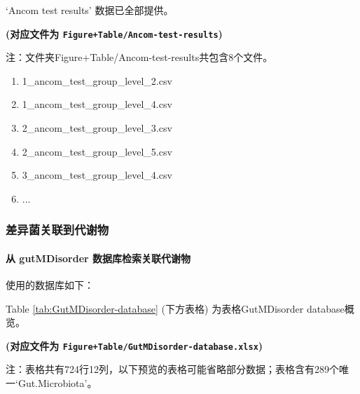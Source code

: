 \documentclass[
]{article}
\providecommand{\tightlist}{%
  \setlength{\itemsep}{0pt}\setlength{\parskip}{0pt}}
\begin{document}
`Ancom test results' 数据已全部提供。

\textbf{(对应文件为 \texttt{Figure+Table/Ancom-test-results})}

\begin{center}\begin{tcolorbox}[colback=gray!10, colframe=gray!50, width=0.9\linewidth, arc=1mm, boxrule=0.5pt]注：文件夹Figure+Table/Ancom-test-results共包含8个文件。

\begin{enumerate}\tightlist
\item 1\_ancom\_test\_group\_level\_2.csv
\item 1\_ancom\_test\_group\_level\_4.csv
\item 2\_ancom\_test\_group\_level\_3.csv
\item 2\_ancom\_test\_group\_level\_5.csv
\item 3\_ancom\_test\_group\_level\_4.csv
\item ...
\end{enumerate}\end{tcolorbox}
\end{center}

\hypertarget{ux5deeux5f02ux83ccux5173ux8054ux5230ux4ee3ux8c22ux7269}{%
\subsubsection{差异菌关联到代谢物}\label{ux5deeux5f02ux83ccux5173ux8054ux5230ux4ee3ux8c22ux7269}}

\hypertarget{ux4ece-gutmdisorder-ux6570ux636eux5e93ux68c0ux7d22ux5173ux8054ux4ee3ux8c22ux7269}{%
\paragraph{从 gutMDisorder 数据库检索关联代谢物}\label{ux4ece-gutmdisorder-ux6570ux636eux5e93ux68c0ux7d22ux5173ux8054ux4ee3ux8c22ux7269}}

使用的数据库如下：

Table \ref{tab:GutMDisorder-database} (下方表格) 为表格GutMDisorder database概览。

\textbf{(对应文件为 \texttt{Figure+Table/GutMDisorder-database.xlsx})}

\begin{center}\begin{tcolorbox}[colback=gray!10, colframe=gray!50, width=0.9\linewidth, arc=1mm, boxrule=0.5pt]注：表格共有724行12列，以下预览的表格可能省略部分数据；表格含有289个唯一`Gut.Microbiota'。
\end{tcolorbox}
\end{center}
\end{document}
